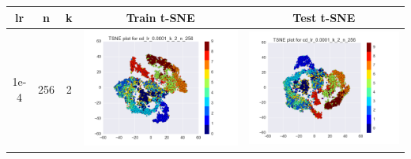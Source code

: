 \documentclass[12pt]{report}
\begin{document}
\begin{table}[H]
  \centering
  \begin{tabular}{ | c | c | c | c || c |}
    \hline
    \textbf{lr} & \textbf{n} & \textbf{k} & \textbf{Train t-SNE} & \textbf{Test t-SNE}\\ \hline
    1e-4 & 256 & 2 &
    \begin{minipage}{.3\textwidth}
      \includegraphics[scale=0.25]{cd_lr_0_0001_k_2_n_256.png}
    \end{minipage} &
    \begin{minipage}{.3\textwidth}
      \includegraphics[scale=0.25]{test_cd_lr_0_0001_k_2_n_256.png}
    \end{minipage}

\end{tabular}
\end{table}
\end{document}
